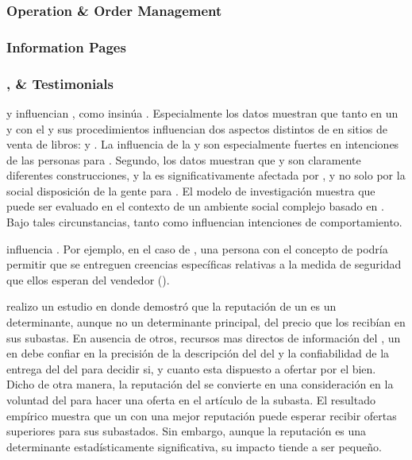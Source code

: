 \subsubsection{Operation \& Order Management}

\subsubsection{Information Pages}


\subsubsection{\security, \trust \& Testimonials}

\trust y \familiarity influencian \ecommerceCOM, como insinúa \luhmanntheory. Especialmente los datos muestran que tanto \trust en un \consumer \internetINT y \familiarity con el \seller y sus procedimientos influencian dos aspectos distintos de \ecommerceCOM en sitios de venta de libros: \inquiry y \purchase. La influencia de la  \familiarity y \trust son especialmente fuertes en intenciones  de las personas para \purchase. Segundo, los datos muestran que \trust y \familiarity son claramente diferentes construcciones, y la \trust es significativamente afectada por \familiarity, y no solo por la social disposición de la gente para \trust. El modelo de investigación muestra que  \ecommerceCOM puede ser evaluado en el contexto de un ambiente social complejo basado en \luhmanntheory. Bajo tales circunstancias, tanto \trust como \familiarity influencian intenciones de comportamiento\cite{gefen2000commerce}.

\security influencia \trust. Por ejemplo, en el caso de \amazonNAME, una persona \familiarity con el concepto de \secureintcom podría permitir que se entreguen creencias específicas relativas a la medida de seguridad que ellos esperan del vendedor (\trust)\cite{gefen2000commerce}.

\ebay realizo un estudio en donde demostró que la reputación \ecommerceCOM de un \seller es un determinante, aunque no un determinante principal, del precio que los \sellers recibían en sus subastas. En ausencia de otros, recursos mas directos de información del \itemsCOM, un \consumer en \internetINT debe confiar en la precisión de la descripción del \itemsCOM del \sellers y la confiabilidad de la entrega del \itemsCOM del \sellers para decidir si, y cuanto esta dispuesto a ofertar por el bien. Dicho de otra manera, la reputación del \sellers se convierte en una consideración en la voluntad del \consumer para hacer una oferta en el artículo de la subasta. El resultado empírico muestra que un \seller con una mejor reputación puede esperar recibir ofertas superiores para sus \itemsCOM subastados. Sin embargo, aunque la reputación es una determinante estadísticamente significativa, su impacto tiende a ser pequeño\cite{melnik2002does}.

